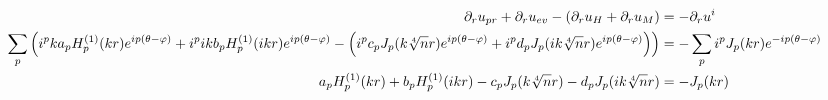 \documentclass[]{article}
\numberwithin{theorem}{section}
\numberwithin{definition}{section}
\numberwithin{proposition}{section}
\numberwithin{lemma}{section}
\numberwithin{equation}{section}
\renewcommand{\phi}{\varphi}
\begin{document}
	\begin{align}
	\partial_r u_{pr}+\partial_r u_{ev} -(\partial_r u_H + \partial_r u_M) &= -\partial_r u^i\\
		\sum_p \paren{i^pka_pH^{(1)}_p(kr)e^{ip(\theta-\phi)}+i^pikb_pH^{(1)}_p(ikr)e^{ip(\theta - \phi)}-\paren{i^pc_pJ_p(k\sqrt[4]{n}r)e^{ip(\theta-\phi)}+i^pd_pJ_p(ik\sqrt[4]{n}r)e^{ip(\theta - \phi)}}} &= -\sum_pi^pJ_p(kr)e^{-ip(\theta - \phi)}\\
		a_pH^{(1)}_p(kr)+b_pH^{(1)}_p(ikr)-c_pJ_p(k\sqrt[4]{n}r)-d_pJ_p(ik\sqrt[4]{n}r) &= -J_p(kr)
	\end{align}
\end{document}
